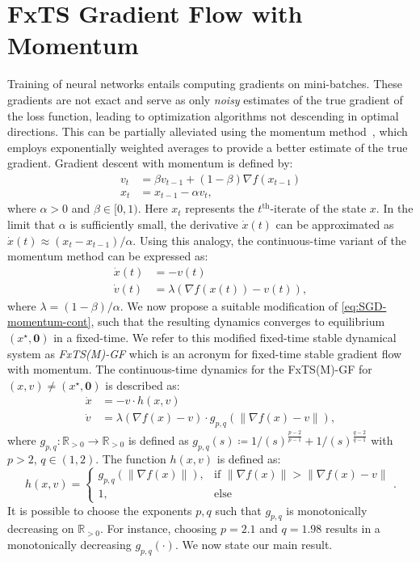 \documentclass[letterpaper]{article}
\begin{document}
\section{FxTS Gradient Flow with Momentum} \label{sec:FxTS-M-GF}
Training of neural networks entails computing gradients on mini-batches. These gradients are not exact and serve as only \emph{noisy} estimates of the true gradient of the loss function, leading to optimization algorithms not descending in optimal directions. This can be partially alleviated using the momentum method~\cite{polyak1964some}, which employs exponentially weighted averages to provide a better estimate of the true gradient. Gradient descent with momentum is defined by:
\begin{align}\label{eq:SGD-momentum}
    v_{t} &= \beta v_{t-1} + (1-\beta)\nabla f(x_{t-1})\nonumber\\
    x_{t} &= x_{t-1} - \alpha v_{t},
\end{align}
where $\alpha>0$ and $\beta\in[0,1)$. Here $x_t$ represents the $t^{\text{th}}$-iterate of the state $x$. In the limit that $\alpha$ is sufficiently small, the derivative $\dot{x}(t)$ can be approximated as $\dot{x}(t)\approx (x_t-x_{t-1})/\alpha$. Using this analogy, the continuous-time variant of the momentum method can be expressed as:
\begin{align}\label{eq:SGD-momentum-cont}
    \dot{x}(t) &= - v(t) \nonumber\\
    \dot{v}(t) &= \lambda (\nabla f(x(t))-v(t)),
\end{align}
where $\lambda = (1-\beta)/\alpha$. We now propose a suitable modification of \eqref{eq:SGD-momentum-cont}, such that the resulting dynamics converges to equilibrium $(x^\star,\bm{0})$ in a fixed-time. We refer to this modified fixed-time stable dynamical system as \emph{FxTS(M)-GF} which is an acronym for fixed-time stable gradient flow with momentum. The continuous-time dynamics for the FxTS(M)-GF for $(x,v)\neq(x^\star,\bm{0})$ is described as:
\begin{align}\label{eq:FxTS-M-GF}
    \dot{x} &= - v\cdot h(x,v)  \nonumber\\
    \dot{v} &= \lambda (\nabla f(x)-v)\cdot g_{p,q}(\|\nabla\!f(x)\!-\!v\|),
\end{align}
where $g_{p,q}:\mathbb R_{>0}\!\to\!\mathbb R_{>0}$ is defined as $g_{p,q}(s)\coloneqq 1\big/{(s)^{\frac{p-2}{p-1}}}+1\big/{(s)^{\frac{q-2}{q-1}}}$ with $p>2$, $q\in(1,2)$. The function $h(x,v)$ is defined as:
\begin{equation*}
    h(x,v) = \left\{\begin{array}{cl}
         \!\!\!g_{p,q}(\|\nabla\!f(x)\|), & \text{if $\|\nabla\!f(x)\|>\|\nabla\!f(x)\!-\!v\|$} \\
         \!\!\!1, & \text{else}
    \end{array}\right.\!.
\end{equation*}
It is possible to choose the exponents $p, q$ such that $g_{p,q}$ is monotonically decreasing on $\mathbb R_{>0}$. For instance, choosing $p=2.1$ and $q=1.98$ results in a monotonically decreasing $g_{p,q}(\cdot)$. We now state our main result.
\end{document}
